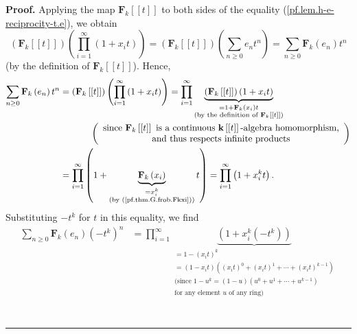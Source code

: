 \documentclass[numbers=enddot,12pt,final,onecolumn,notitlepage]{scrartcl}%
\theoremstyle{definition}
\newenvironment{proof}[1][Proof]{\noindent\textbf{#1.} }{\ \rule{0.5em}{0.5em}}
\let\sumnonlimits\sum
\let\prodnonlimits\prod
\renewcommand{\sum}{\sumnonlimits\limits}
\renewcommand{\prod}{\prodnonlimits\limits}
\begin{document}
\begin{proof}
Applying the map $\mathbf{F}_{k}\left[  \left[  t\right]  \right]  $ to both
sides of the equality (\ref{pf.lem.h-e-reciprocity-t.e}), we obtain%
\[
\left(  \mathbf{F}_{k}\left[  \left[  t\right]  \right]  \right)  \left(
\prod_{i=1}^{\infty}\left(  1+x_{i}t\right)  \right)  =\left(  \mathbf{F}%
_{k}\left[  \left[  t\right]  \right]  \right)  \left(  \sum_{n\geq0}%
e_{n}t^{n}\right)  =\sum_{n\geq0}\mathbf{F}_{k}\left(  e_{n}\right)  t^{n}%
\]
(by the definition of $\mathbf{F}_{k}\left[  \left[  t\right]  \right]  $).
Hence,%
\begin{align*}
\sum_{n\geq0}\mathbf{F}_{k}\left(  e_{n}\right)  t^{n}  &  =\left(
\mathbf{F}_{k}\left[  \left[  t\right]  \right]  \right)  \left(  \prod
_{i=1}^{\infty}\left(  1+x_{i}t\right)  \right)  =\prod_{i=1}^{\infty
}\underbrace{\left(  \mathbf{F}_{k}\left[  \left[  t\right]  \right]  \right)
\left(  1+x_{i}t\right)  }_{\substack{=1+\mathbf{F}_{k}\left(  x_{i}\right)
t\\\text{(by the definition of }\mathbf{F}_{k}\left[  \left[  t\right]
\right]  \text{)}}}\\
&  \ \ \ \ \ \ \ \ \ \ \left(
\begin{array}
[c]{c}%
\text{since }\mathbf{F}_{k}\left[  \left[  t\right]  \right]  \text{ is a
continuous }\mathbf{k}\left[  \left[  t\right]  \right]  \text{-algebra
homomorphism,}\\
\text{and thus respects infinite products}%
\end{array}
\right) \\
&  =\prod_{i=1}^{\infty}\left(  1+\underbrace{\mathbf{F}_{k}\left(
x_{i}\right)  }_{\substack{=x_{i}^{k}\\\text{(by (\ref{pf.thm.G.frob.Fkxi}))}%
}}t\right)  =\prod_{i=1}^{\infty}\left(  1+x_{i}^{k}t\right)  .
\end{align*}
Substituting $-t^{k}$ for $t$ in this equality, we find%
\begin{align*}
\sum_{n\geq0}\mathbf{F}_{k}\left(  e_{n}\right)  \left(  -t^{k}\right)  ^{n}
&  =\prod_{i=1}^{\infty}\underbrace{\left(  1+x_{i}^{k}\left(  -t^{k}\right)
\right)  }_{\substack{=1-\left(  x_{i}t\right)  ^{k}\\=\left(  1-x_{i}%
t\right)  \left(  \left(  x_{i}t\right)  ^{0}+\left(  x_{i}t\right)
^{1}+\cdots+\left(  x_{i}t\right)  ^{k-1}\right)  \\\text{(since }%
1-u^{k}=\left(  1-u\right)  \left(  u^{0}+u^{1}+\cdots+u^{k-1}\right)
\\\text{for any element }u\text{ of any ring)}}}\\

\end{align*}
\end{proof}
\end{document}
